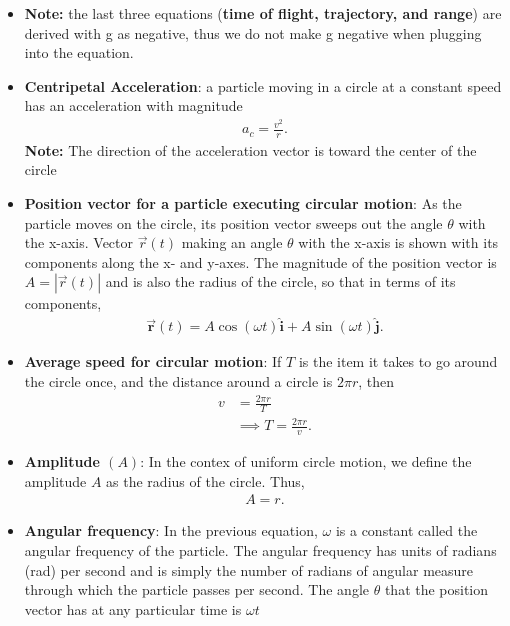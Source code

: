 \documentclass{report}
\begin{document}
\begin{itemize}
            \item \textbf{Note:} the last three equations (\textbf{time of flight, trajectory, and range}) are derived with g as negative, thus we do not make g negative when plugging into the equation. 
            \item \textbf{Centripetal Acceleration}: a particle moving in a circle at a constant speed has an acceleration with magnitude
                \begin{align*}
                    a_{c} = \frac{v^{2}}{r}
                .\end{align*}
                \textbf{Note:} The direction of the acceleration vector is toward the center of the circle
            \item \textbf{Position vector for a particle executing circular motion}:
                As the particle moves on the circle, its position vector sweeps out the angle $\theta$ with the x-axis. Vector $\vec{r}(t)$ making an angle $\theta$ with the x-axis is shown with its components along the x- and y-axes. The magnitude of the position vector is $A=|\vec{r}(t)|$ and is also the radius of the circle, so that in terms of its components,
                \begin{align*}
                    \vec{\mathbf{r}}(t) = A\cos(\omega t)\hat{\mathbf{i}} + A\sin(\omega t)\hat{\mathbf{j}}
                .\end{align*}
            \item \textbf{Average speed for circular motion}: If $T$ is the item it takes to go around the circle once, and the distance around a circle is $2\pi r$, then 
                \begin{align*}
                    v &= \frac{2\pi r}{T} \\
                      &\implies T = \frac{2\pi r}{v}
                .\end{align*}
            \item \textbf{Amplitude $(A)$}: In the contex of uniform circle motion, we define the amplitude $A$ as the radius of the circle. Thus,
                \begin{align*}
                    A = r
                .\end{align*}
            \item \textbf{Angular frequency}: In the previous equation, $\omega$ is a constant called the angular frequency of the particle.
                \bigbreak \noindent 
                The angular frequency has units of radians (rad) per second and is simply the number of radians of angular measure through which the particle passes per second. The angle  $\theta$ that the position vector has at any particular time is  $\omega t$

\end{itemize}
\end{document}
